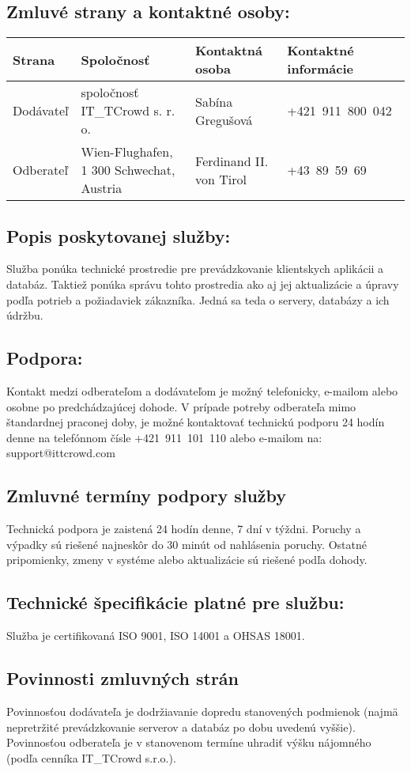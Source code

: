 \documentclass[a4paper, 11pt]{article}
\begin{document}
\begin{center}
\subsection*{Zmluvé strany a kontaktné osoby:}
\begin{tabular}{| l | l | l | l |}
\hline
\textbf{Strana} & \textbf{Spoločnosť} & \textbf{Kontaktná osoba} & \textbf{Kontaktné informácie} \\
\hline
Dodávateľ & spoločnosť IT\_TCrowd s. r. o. & Sabína Gregušová & +421~911~800~042\\
\hline
Odberateľ & Wien-Flughafen, 1 300 Schwechat, Austria & Ferdinand II. von Tirol & +43~89~59~69\\
\hline
\end{tabular}

\subsection*{Popis poskytovanej služby:}
Služba ponúka technické prostredie pre prevádzkovanie klientskych aplikácii a databáz. Taktiež ponúka správu tohto prostredia ako aj jej aktualizácie a úpravy podľa potrieb a požiadaviek zákazníka. Jedná sa teda o servery, databázy a ich údržbu.

\subsection*{Podpora:}
Kontakt medzi odberateľom a dodávateľom je možný telefonicky, e-mailom alebo osobne po predchádzajúcej dohode. V prípade potreby odberateľa mimo štandardnej praconej doby, je možné kontaktovať technickú podporu 24 hodín denne na telefónnom čísle +421~911~101~110 alebo e-mailom na: support@ittcrowd.com 

\subsection*{Zmluvné termíny podpory služby}
Technická podpora je zaistená 24 hodín denne, 7 dní v týždni. Poruchy a výpadky sú riešené najneskôr do 30 minút od nahlásenia poruchy. Ostatné pripomienky, zmeny v systéme alebo aktualizácie sú riešené podľa dohody.

\subsection*{Technické špecifikácie platné pre službu:}
Služba je certifikovaná ISO 9001, ISO 14001 a OHSAS 18001.

\subsection*{Povinnosti zmluvných strán}
Povinnosťou dodávateľa je dodržiavanie dopredu stanovených podmienok (najmä nepretržité prevádzkovanie serverov a databáz po dobu uvedenú vyššie). Povinnosťou odberateľa je v stanovenom termíne uhradiť výšku nájomného (podľa cenníka IT\_TCrowd s.r.o.).


\end{center}
\end{document}
